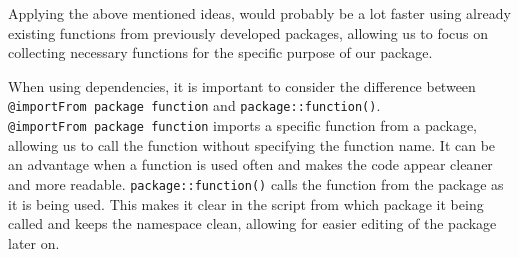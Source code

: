 \documentclass[
]{article}
\begin{document}
Applying the above mentioned ideas, would probably be a lot faster using
already existing functions from previously developed packages, allowing
us to focus on collecting necessary functions for the specific purpose
of our package.

When using dependencies, it is important to consider the difference
between \texttt{@importFrom\ package\ function} and
\texttt{package::function()}. \texttt{@importFrom\ package\ function}
imports a specific function from a package, allowing us to call the
function without specifying the function name. It can be an advantage
when a function is used often and makes the code appear cleaner and more
readable. \texttt{package::function()} calls the function from the
package as it is being used. This makes it clear in the script from
which package it being called and keeps the namespace clean, allowing
for easier editing of the package later on.
\end{document}

